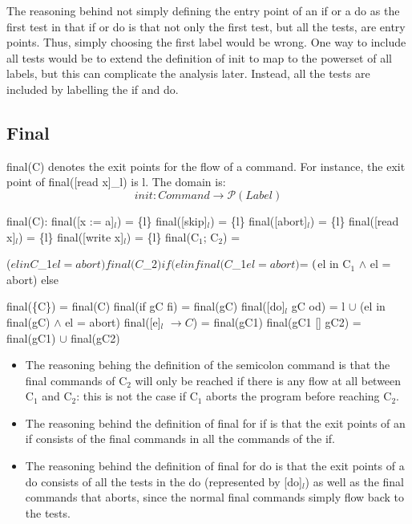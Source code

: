 The reasoning behind not simply defining the entry point of an if or a do as the first
test in that if or do is that not only the first test, but all the tests, are entry points.
Thus, simply choosing the first label would be wrong. One way to include all tests would
be to extend the definition of init to map to the powerset of all labels, but this
can complicate the analysis later. Instead, all the tests are included by labelling
the if and do.



\subsection{Final}

final(C) denotes the exit points for the flow of a command.
For instance, the exit point of final([read x]_l) is l. The domain is:
\[init \colon Command \to \mathcal{P}(Label)\]

final(C):\newline
final([x := a]$_l$)      = \{l\}\newline
final([skip]$_l$)        = \{l\}\newline
final([abort]$_l$)       = \{l\}\newline
final([read x]$_l$)      = \{l\}\newline
final([write x]$_l$)   	 = \{l\}\newline
final(C$_1$; C$_2$)		 = \begin{cases}
($el in C$_1$ $\wedge$ el = abort) $\cup$ final(C$_2$) if (el in final(C$_1$ $\wedge$ el $\not$ = abort) $\not = \emptyset$ \\
($el in C$_1$ $\wedge$ el = abort) else
\end{cases}\newline
final(\{C\})             = final(C)\newline
final(if gC fi)        = final(gC)\newline
final([do]$_l$ gC od)        = {l} $\cup$ (el in final(gC) $\wedge$ el = abort)\newline
final([e]$_l$ $\to C$)      = final(gC1)\newline
final(gC1 [] gC2)      = final(gC1) $\cup$ final(gC2)\newline

\begin{itemize}
\item The reasoning behing the definition of the semicolon command is that the
final commands of C$_2$ will only be reached if there is any flow at all
between C$_1$ and C$_2$: this is not the case if C$_1$ aborts the program
before reaching C$_2$.
\item The reasoning behind the definition of final for if is that the exit points
of an if consists of the final commands in all the commands of the if.
\item The reasoning behind the definition of final for do is that the exit points
of a do consists of all the tests in the do (represented by [do]$_l$)
as well as the final commands that aborts, since the normal final commands
simply flow back to the tests.
\end{itemize}



